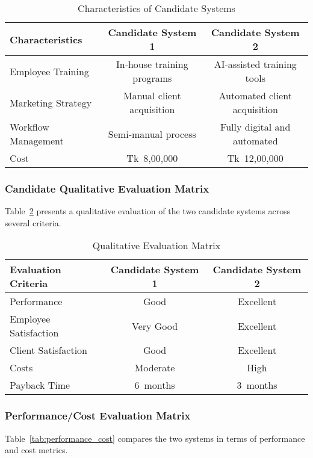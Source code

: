 \documentclass[12pt,a4paper]{article}
\begin{document}
\begin{table}[H]
    \centering
    \renewcommand{\arraystretch}{1.3}
    \begin{tabular}{|p{4cm}|c|c|}
        \hline
        \textbf{Characteristics} & \textbf{Candidate System 1} & \textbf{Candidate System 2} \\
        \hline
        Employee Training & In‑house training programs & AI‑assisted training tools \\
        \hline
        Marketing Strategy & Manual client acquisition & Automated client acquisition \\
        \hline
        Workflow Management & Semi‑manual process & Fully digital and automated \\
        \hline
        Cost & Tk 8{,}00{,}000 & Tk 12{,}00{,}000 \\
        \hline
    \end{tabular}
    \caption{Characteristics of Candidate Systems}
    \label{tab:characteristics}
\end{table}

\newpage
\subsubsection{Candidate Qualitative Evaluation Matrix}
Table~\ref{tab:qualitative_matrix} presents a qualitative evaluation of the two candidate systems across several criteria.

\begin{table}[H]
    \centering
    \renewcommand{\arraystretch}{1.3}
    \begin{tabular}{|p{4cm}|c|c|}
        \hline
        \textbf{Evaluation Criteria} & \textbf{Candidate System 1} & \textbf{Candidate System 2} \\
        \hline
        Performance & Good & Excellent \\
        \hline
        Employee Satisfaction & Very Good & Excellent \\
        \hline
        Client Satisfaction & Good & Excellent \\
        \hline
        Costs & Moderate & High \\
        \hline
        Payback Time & 6 months & 3 months \\
        \hline
    \end{tabular}
    \caption{Qualitative Evaluation Matrix}
    \label{tab:qualitative_matrix}
\end{table}

\subsubsection{Performance/Cost Evaluation Matrix}
Table~\ref{tab:performance_cost} compares the two systems in terms of performance and cost metrics.
\end{document}
